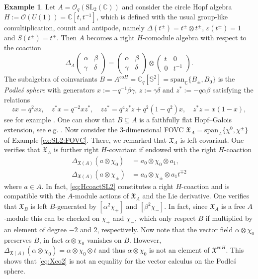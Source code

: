\documentclass{article}
\theoremstyle{definition}
\newtheorem{example}[thm]{Example}
\begin{document}
\begin{example}\label{ex:SLq2'}
	Let $A=\mathcal{O}_q(\mathrm{SL}_2(\mathbb{C}))$ and consider
	the circle Hopf algebra $H:=\mathcal{O}(U(1))=\mathbb{C}[t,t^{-1}]$, which is defined with the usual group-like comultiplication, counit and antipode, namely $\Delta(t^\pm)=t^\pm\otimes t^\pm$, $\varepsilon(t^\pm)=1$ and $S(t^\pm)=t^\mp$. Then $A$ becomes a right $H$-comodule algebra with respect to the coaction
	$$
	\Delta_A\begin{pmatrix}
		\alpha & \beta\\
		\gamma & \delta
	\end{pmatrix}=\begin{pmatrix}
		\alpha & \beta\\
		\gamma & \delta
	\end{pmatrix}\otimes\begin{pmatrix}
		t & 0\\
		0 & t^{-1}
	\end{pmatrix}.
	$$
	The subalgebra of coinvariants $B=A^{\mathrm{co}H}=\mathbb{C}_q[\mathbb{S}^2]=\mathrm{span}_\mathbb{C}\{B_\pm,B_0\}$ is the \textit{Podle\'s sphere} with generators $x:=-q^{-1}\beta\gamma$, $z:=\gamma\delta$ and $z^*:=-q\alpha\beta$ satisfying the relations
	$$
	zx=q^2xz,\quad
	z^*x=q^{-2}xz^*,\quad
	zz^*=q^4z^*z+q^2(1-q^2)x,\quad
	z^*z=x(1-x),
	$$
	see for example \cite[Lemma 2.3.4]{bm}.
	One can show that $B\subseteq A$ is a faithfully flat Hopf--Galois extension, see e.g. \cite[Example 6.26]{BrJaMa}.
	Now consider the $3$-dimensional FOVC $\mathfrak{X}_A=\mathrm{span}_A\{\chi^0,\chi^\pm\}$ of Example \ref{ex:SL2:FOVC}. There, we remarked that $\mathfrak{X}_A$ is left covariant. One verifies that $\mathfrak{X}_A$ is further right $H$-covariant if endowed with the right $H$-coaction
	\begin{equation}\label{eq:HcoactSL2}
		\begin{split}
			\Delta_{\mathfrak{X}(A)}(a\otimes\chi_0)&=a_0\otimes\chi_0\otimes a_1,\\
			\Delta_{\mathfrak{X}(A)}(a\otimes\chi_\pm)&=a_0\otimes\chi_\pm\otimes a_1t^{\mp 2}
		\end{split}
	\end{equation}
	where $a\in A$. In fact, \eqref{eq:HcoactSL2} constitutes a right $H$-coaction and is compatible with the $A$-module actions of $\mathfrak{X}_A$ and the Lie derivative.
	One verifies that $\mathfrak{X}_B$ is left $B$-generated by $[\alpha^2\chi_+]$ and $[\beta^2\chi_-]$. 
	In fact, since $\mathfrak{X}_A$ is a free $A$-module this can be checked on $\chi_+$ and $\chi_-$, which only respect $B$ if multiplied by an element of degree $-2$ and $2$, respectively.
	Now note that the vector field $\alpha\otimes\chi_0$ preserves $B$, in fact $\alpha\otimes\chi_0$ vanishes on $B$. However, $\Delta_{\mathfrak{X}(A)}(\alpha\otimes\chi_0)=\alpha\otimes\chi_0\otimes t$ and thus $\alpha\otimes\chi_0$ is not an element of $\mathfrak{X}^{\mathrm{co}H}$. This shows that \eqref{eq:Xco2} is not an equality for the vector calculus on the Podle\'s sphere.
\end{example}
\end{document}
